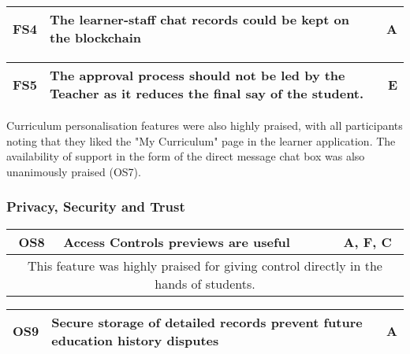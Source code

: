 \begin{table}[!ht]
	\begin{tabularx}{\textwidth}{|c|X|c|}
		\hline
		FS4 & \textbf{The learner-staff chat records could be kept on the blockchain} & A \\
		\hline
	\end{tabularx}
\end{table}

\begin{table}[!ht]
	\begin{tabularx}{\textwidth}{|c|X|c|}
		\hline
		FS5 & \textbf{The approval process should not be led by the Teacher as it reduces the final say of the student.} & E \\
		\hline
	\end{tabularx}
\end{table}

Curriculum personalisation features were also highly praised,
with all participants noting that they liked the "My Curriculum" page in the 
learner application. The availability of support in the form of the direct message 
chat box was also unanimously praised (OS7).




\subsubsection{Privacy, Security and Trust}

\begin{table}[!ht]
	\begin{tabularx}{\textwidth}{|c|X|c|}
		\hline
		OS8 & \textbf{Access Controls previews are useful} & A, F, C \\
		\hline
		\multicolumn{3}{|X|}{
			This feature was highly praised for giving control directly in the hands of students.
		}                                                            \\
		\hline
	\end{tabularx}
\end{table}

\begin{table}[!ht]
	\begin{tabularx}{\textwidth}{|c|X|c|}
		\hline
		OS9 & \textbf{Secure storage of detailed records prevent future education history disputes} & A \\
		\hline
	\end{tabularx}
\end{table}

